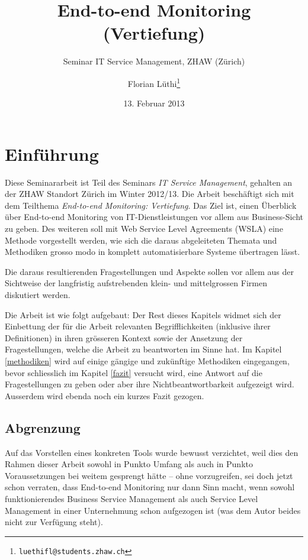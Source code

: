 \documentclass[11pt,listof=totoc]{scrreprt} %
\title{End-to-end Monitoring (Vertiefung)}
\subtitle{Seminar IT Service Management, ZHAW (Zürich)}
\author{Florian Lüthi\footnote{\tt luethifl@students.zhaw.ch}}
\date{13. Februar 2013} %
\theoremstyle{definition}
\begin{document}
\maketitle

\tableofcontents

\chapter{Einführung}

Diese Seminararbeit ist Teil des Seminars {\em IT Service Management}, gehalten an der ZHAW Standort Zürich im Winter 2012/13. Die Arbeit beschäftigt sich mit dem Teilthema {\em End-to-end Monitoring: Vertiefung}. Das Ziel  ist, einen Überblick über End-to-end Monitoring von IT-Dienstleistungen vor allem aus Business-Sicht zu geben. Des weiteren soll mit Web Service Level Agreements (WSLA) eine Methode vorgestellt werden, wie sich die daraus abgeleiteten Themata und Methodiken grosso modo in komplett automatisierbare Systeme übertragen lässt.

Die daraus resultierenden Fragestellungen und Aspekte sollen vor allem aus der Sichtweise der langfristig aufstrebenden klein- und mittelgrossen Firmen diskutiert werden.

Die Arbeit ist wie folgt aufgebaut: Der Rest dieses Kapitels widmet sich der Einbettung der für die Arbeit relevanten Begrifflichkeiten (inklusive ihrer Definitionen) in ihren grösseren Kontext sowie der Ansetzung der Fragestellungen, welche die Arbeit zu beantworten im Sinne hat. Im Kapitel \ref{methodiken} wird auf einige gängige und zukünftige Methodiken eingegangen, bevor schliesslich im Kapitel \ref{fazit} versucht wird, eine Antwort auf die Fragestellungen zu geben oder aber ihre Nichtbeantwortbarkeit aufgezeigt wird. Ausserdem wird ebenda noch ein kurzes Fazit gezogen.

\section{Abgrenzung}

Auf das Vorstellen eines konkreten Tools wurde bewusst verzichtet, weil dies den Rahmen dieser Arbeit sowohl in Punkto Umfang als auch in Punkto Voraussetzungen bei weitem gesprengt hätte -- ohne vorzugreifen, sei doch jetzt schon verraten, dass End-to-end Monitoring nur dann Sinn macht, wenn sowohl funktionierendes Business Service Management als auch Service Level Management in einer Unternehmung schon aufgezogen ist (was dem Autor beides nicht zur Verfügung steht).
\end{document}
